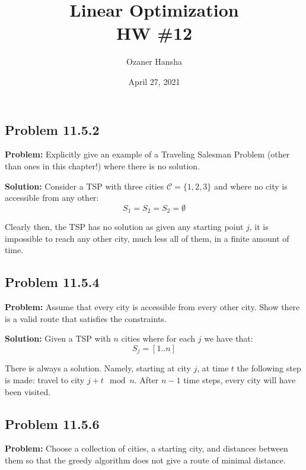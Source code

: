 \documentclass{article}
\begin{document}
\title{Linear Optimization\\HW \#12}
\author{Ozaner Hansha}
\date{April 27, 2021}
\maketitle

\subsection*{Problem 11.5.2}
\noindent\textbf{Problem:} Explicitly give an example of a Traveling Salesman Problem (other than ones in this chapter!) where there is no solution.
\bigskip

\noindent\textbf{Solution:} Consider a TSP with three cities $\mathcal C=\{1,2,3\}$ and where no city is accessible from any other:
$$S_1=S_2=S_2=\emptyset$$

Clearly then, the TSP has no solution as given any starting point $j$, it is impossible to reach any other city, much less all of them, in a finite amount of time.

\subsection*{Problem 11.5.4}
\noindent\textbf{Problem:} Assume that every city is accessible from every other city. Show there is a valid route that satisfies the constraints.
\bigskip

\noindent\textbf{Solution:} Given a TSP with $n$ cities where for each $j$ we have that:
$$S_j=[1..n]$$

There is always a solution. Namely, starting at city $j$, at time $t$ the following step is made: travel to city $j+t \mod n$. After $n-1$ time steps, every city will have been visited.

\subsection*{Problem 11.5.6}
\noindent\textbf{Problem:} Choose a collection of cities, a starting city, and distances between them so that the greedy algorithm does not give a route of minimal distance.
\bigskip
\end{document}
